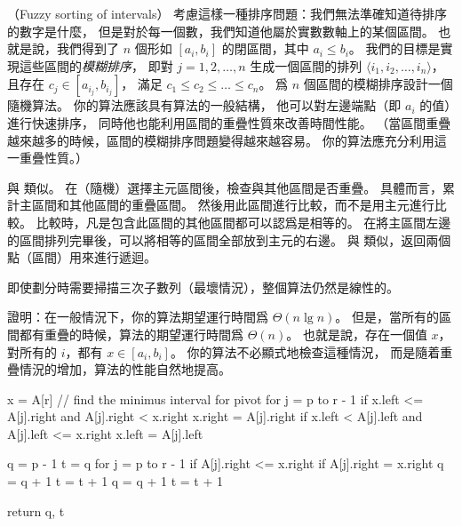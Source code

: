 \startPROBLEM
（Fuzzy sorting of intervals）
考慮這樣一種排序問題：我們無法準確知道待排序的數字是什麼，
但是對於每一個數，我們知道他屬於實數數軸上的某個區間。
也就是說，我們得到了 $n$ 個形如 $[a_i,b_i]$ 的閉區間，其中 $a_i\le b_i$。
我們的目標是實現這些區間的\emph{模糊排序}，
即對 $j=1,2,\ldots,n$ 生成一個區間的排列 $\langle i_1,i_2,\ldots,i_n\rangle$，
且存在 $c_j \in [a_{i_j}, b_{i_j}]$，
滿足 $c_1\le c_2\le\ldots\le c_n$。
\startigBase[a]\startitem
爲 $n$ 個區間的模糊排序設計一個隨機算法。
你的算法應該具有算法的一般結構，
他可以對左邊端點（即 $a_i$ 的值）進行快速排序，
同時他也能利用區間的重疊性質來改善時間性能。
（當區間重疊越來越多的時候，區間的模糊排序問題變得越來越容易。
你的算法應充分利用這一重疊性質。）
\stopitem\stopigBase

\startANSWER
與 類似。
在（隨機）選擇主元區間後，檢查與其他區間是否重疊。
具體而言，累計主區間和其他區間的重疊區間。
然後用此區間進行比較，而不是用主元進行比較。
比較時，凡是包含此區間的其他區間都可以認爲是相等的。
在將主區間左邊的區間排列完畢後，可以將相等的區間全部放到主元的右邊。
與 類似，返回兩個點（區間）用來進行遞迴。

即使劃分時需要掃描三次子數列（最壞情況），整個算法仍然是線性的。
\stopANSWER

\startigBase[a,continue]\startitem
證明：在一般情況下，你的算法期望運行時間爲 $\Theta(n\lg{n})$。
但是，當所有的區間都有重疊的時候，算法的期望運行時間爲 $\Theta(n)$。
也就是說，存在一個值 $x$，對所有的 $i$，都有 $x\in [a_i,b_i]$。
你的算法不必顯式地檢查這種情況，
而是隨着重疊情況的增加，算法的性能自然地提高。
\stopitem\stopigBase

\startANSWER
{}
\startCLRSCODE
x = A[r]
// find the minimus interval for pivot
for j = p to r - 1
	if x.left <= A[j].right and A[j].right < x.right
		x.right = A[j].right
	if x.left < A[j].left and A[j].left <= x.right
		x.left = A[j].left

q = p - 1
t = q
for j = p to r - 1
	if A[j].right <= x.right
		if A[j].right = x.right
			q = q + 1
		t = t + 1
q = q + 1
t = t + 1

return q, t
\stopCLRSCODE
\stopANSWER

\stopPROBLEM
